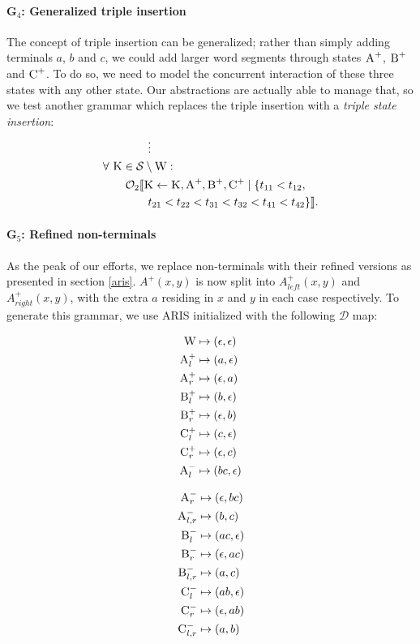 \documentclass[nonatbib,numbers,10pt]{sigplanconf}
\newcommand\s{\textsc}
\newcommand{\Orderr}[5]{
	\mathcal{#1}_{#5}\llbracket #2 \leftarrow #3 \mid \{ #4 \} \rrbracket.
}
\newcommand{\Or}[4]{\Orderr{O}{#1}{#2}{#3}{#4}}
\begin{document}
\paragraph{G$_4$: Generalized triple insertion}
The concept of triple insertion can be generalized; rather than simply adding terminals $a$, $b$ and $c$, we could add larger word segments through states $\s{A}^+$, $\s{B}^+$ and $\s{C}^+$. To do so, we need to model the concurrent interaction of these three states with any other state. Our abstractions are actually able to manage that, so we test another grammar which replaces the triple insertion with a \textit{triple state insertion}:
\begin{align*}
& \quad\quad\quad\quad \vdots \\
&\forall \ \s{K} \in \mathcal{S} \setminus \s{W}:\\ 
&\quad\quad\Or{\s{K}}{\s{K}, \s{A}^+, \s{B}^+, \s{C}^+}{t_{11} < t_{12},\\
&\quad\quad\quad\quad t_{21} < t_{22} < t_{31} < t_{32} < t_{41} < t_{42}}{2}
\end{align*}
\paragraph{G$_5$: Refined non-terminals}
As the peak of our efforts, we replace non-terminals with their refined versions as presented in section \ref{aris}. $A^{+}(x,y)$ is now split into $A^{+}_{left}(x,y)$ and $A^{+}_{right}(x,y)$, with the extra $a$ residing in $x$ and $y$ in each case respectively. To generate this grammar, we use ARIS initialized with the following $\mathcal{D}$ map:

\begin{minipage}{.2\textwidth}
\begin{align*}
\s{W} &\mapsto (\epsilon, \epsilon) \\
\s{A}^+_{l} &\mapsto (a, \epsilon) \\
\s{A}^+_{r} &\mapsto (\epsilon, a) \\
\s{B}^+_{l} &\mapsto (b, \epsilon) \\
\s{B}^+_{r} &\mapsto (\epsilon, b) \\
\s{C}^+_{l} &\mapsto (c, \epsilon) \\
\s{C}^+_{r} &\mapsto (\epsilon, c) \\
\s{A}^-_{l} &\mapsto (bc, \epsilon) 
\end{align*}
\end{minipage}
\begin{minipage}{.2\textwidth}
\begin{align*}
\s{A}^-_{r} &\mapsto (\epsilon, bc) \\
\s{A}^-_{l, r} &\mapsto (b, c) \\
\s{B}^-_{l} &\mapsto (ac, \epsilon) \\
\s{B}^-_{r} &\mapsto (\epsilon, ac) \\
\s{B}^-_{l, r} &\mapsto (a, c) \\
\s{C}^-_{l} &\mapsto (ab, \epsilon) \\
\s{C}^-_{r} &\mapsto (\epsilon, ab) \\
\s{C}^-_{l, r} &\mapsto (a, b)
\end{align*}
\end{minipage}
\end{document}
